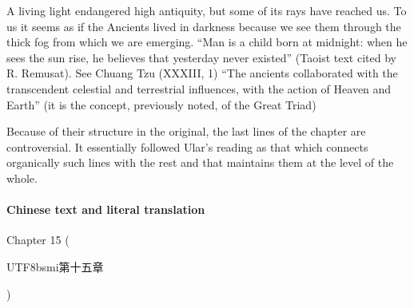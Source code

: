\begin{quotex}
A living light endangered high antiquity, but some of its rays have reached us. To us it seems as if the Ancients lived in darkness because we see them through the thick fog from which we are emerging. ``Man is a child born at midnight: when he sees the sun rise, he believes that yesterday never existed'' (Taoist text cited by R. Remusat). See Chuang Tzu (XXXIII, 1) ``The ancients collaborated with the transcendent celestial and terrestrial influences, with the action of Heaven and Earth'' (it is the concept, previously noted, of the Great Triad)
\end{quotex}


Because of their structure in the original, the last lines of the chapter are controversial. It essentially followed Ular's reading as that which connects organically such lines with the rest and that maintains them at the level of the whole.

\paragraph{Chinese text and literal translation}

Chapter 15 (\begin{CJK*}{UTF8}{bsmi}第十五章\end{CJK*})

